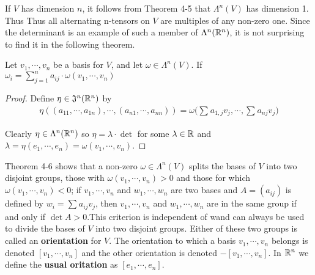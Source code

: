 If $V$ has dimension $n$, it follows from Theorem 4-5 that $\Lambda^n(V)$ has dimension 1. Thus 
Thus all alternating n-tensors on $V$ are multiples of any non-zero one.
Since the determinant is an example of such a member of $\Lambda^n(\mathbb{R}^n)$, it is not surprising
to find it in the following theorem.
\begin{theorem}
    Let $v_1, \cdots, v_n$ be a basis for $V$, and let $\omega\in \Lambda^n(V)$. If 
    $\omega_i = \sum_{j=1}^{n}{a_{ij}\cdot\omega(v_1, \cdots, v_n)}$
\end{theorem}

\begin{proof}
    Define $\eta\in \mathfrak{J}^n(\mathbb{R}^n)$ by 
    \begin{align*}
        \eta((a_{11}, \cdots, a_{1n}), \cdots, (a_{n1}, \cdots, a_{nn}))
        = \omega\big(\sum_{}^{}{a_{1,j}v_j}, \cdots, \sum_{}^{}{a_{nj}v_j}\big)
    \end{align*}

    Clearly $\eta\in \Lambda^n(\mathbb{R}^n)$ so $\eta=\lambda\cdot\det$ for some $\lambda\in \mathbb{R}$
    and $\lambda=\eta(e_1,\cdots,e_n) = \omega(v_1, \cdots, v_n)$.
\end{proof}

Theorem 4-6 shows that a non-zero $\omega\in \Lambda^n(V)$ splits the
bases of $V$ into two disjoint groups, those with $\omega(v_1, \cdots, v_n)>0$ 
and those for which $\omega(v_1, \cdots, v_n) < 0$; if $v_1, \cdots, v_n$
and $w_1,\cdots, w_n$ are two bases and $A = (a_{ij})$ is defined by
$w_i = \sum_{}^{}{a_{ij}v_j}$, then $v_1,\cdots,v_n$ and $w_1, \cdots, w_n$ are in the
same group if and only if $\det A > 0$.This criterion is independent of wand can always 
be used to divide the bases of $V$ into two disjoint groups.
Either of these two groups is called an \textbf{orientation} for $V$.
The orientation to which a basis $v_1,\cdots,v_n$ belongs is denoted 
$[v_1, \cdots, v_n]$ and the other orientation is denoted $-[v_1, \cdots, v_n]$.
In $\mathbb{R}^n$ we define the \textbf{usual oritation} as $[e_1, \cdots, e_n]$.

